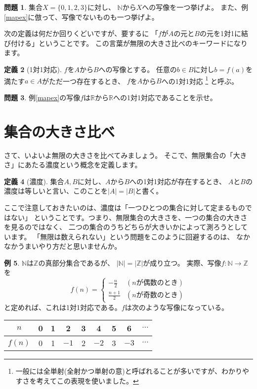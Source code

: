 \documentclass[./main]{subfiles} %
\theoremstyle{definition}
\newtheorem{defi}{定義}[section]
\newtheorem{ex}[defi]{例}
\newtheorem{qst}[defi]{問題}
\begin{document}
\begin{qst}
\label{mapq}
集合$X=\{0,1,2,3\}$に対し、
$\mathbb{N}$から$X$への写像を一つ挙げよ。
また、例\ref{mapex}に倣って、写像でないものも一つ挙げよ。
\end{qst}

次の定義は何だか回りくどいですが、要するに
「$f$が$A$の元と$B$の元を1対1に結び付ける」ということです。
この言葉が無限の大きさ比べのキーワードになります。

\begin{defi}[1対1対応]
$f$を$A$から$B$への写像とする。
任意の$b\in B$に対し$b=f(a)$を満たす$a\in A$がただ一つ存在するとき、
$f$を$A$から$B$への1対1対応
\footnote{一般には全単射(全射かつ単射の意)と呼ばれることが多いですが、わかりやすさを考えてこの表現を使いました。}
と呼ぶ。
\end{defi}

\begin{qst}
\label{bijecq}
例\ref{mapex}の写像$f$は$\mathbb{R}$から$\mathbb{R}$への1対1対応であることを示せ。
\end{qst}

\section{集合の大きさ比べ}
さて、いよいよ無限の大きさを比べてみましょう。
そこで、無限集合の「大きさ」にあたる濃度という概念を定義します。

\begin{defi}[濃度]
集合$A,B$に対し、$A$から$B$への1対1対応が存在するとき、
$A$と$B$の濃度は等しいと言い、このことを$|A|=|B|$と書く。
\end{defi}

ここで注意しておきたいのは、濃度は「一つひとつの集合に対して定まるものではない」
ということです。つまり、無限集合の大きさを、一つの集合の大きさを見るのではなく、
二つの集合のうちどちらが大きいかによって測ろうとしています。
「無限は数えられない」という問題をこのように回避するのは、
なかなかうまいやり方だと思いませんか。

\begin{ex}
\label{NandZ}
$\mathbb{N}$は$\mathbb{Z}$の真部分集合であるが、
$|\mathbb{N}|=|\mathbb{Z}|$が成り立つ。
実際、写像$f\colon\mathbb{N}\to\mathbb{Z}$を
\[
f(n)=
\begin{cases}
-\frac{n}{2} & (nが偶数のとき) \\
\frac{n+1}{2} & (nが奇数のとき)
\end{cases}
\]
と定めれば、これは1対1対応である。$f$は次のような写像になっている。
\begin{table}[h]
\centering
\begin{tabular}{c||c|c|c|c|c|c|c|c}
$n$&0&1&2&3&4&5&6&$\cdots$ \\\hline
$f(n)$&0&1&$-1$&2&$-2$&3&$-3$&$\cdots$
\end{tabular}
\end{table}
\end{ex}
\end{document}
